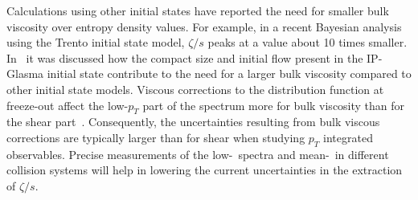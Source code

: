 Calculations using other initial states have reported the need for smaller bulk 
  viscosity over entropy density values. 
For example, in a recent Bayesian analysis using the Trento initial state model, 
  $\zeta/s$ peaks at a value about 10 times smaller. 
In~\cite{Schenke:2018fci} it was discussed how the compact size and initial 
  flow present in the IP-Glasma initial state contribute to the need for a 
  larger bulk viscosity compared to other initial state models. 
Viscous corrections to the distribution function at freeze-out affect the 
  low-$p_T$ part of the spectrum more for bulk viscosity than for the shear 
  part~\cite{Bozek:2009dw,Paquet:2015lta}. 
Consequently, the uncertainties resulting from bulk viscous corrections are 
  typically larger than for shear when studying $p_T$ integrated observables. 
Precise measurements of the low-\pt\ spectra and mean-\pt\ in different 
  collision systems  will help in lowering the current uncertainties
  in the extraction of $\zeta/s$.


